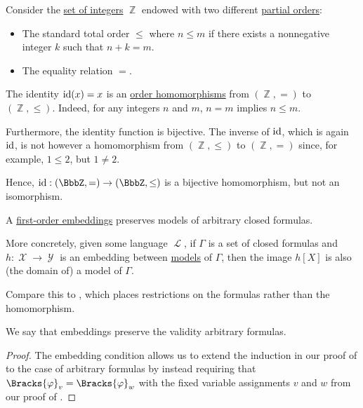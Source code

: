 \begin{example}\label{ex:bijective_order_homomorphism_not_isomorphism}
  Consider the \hyperref[def:integers]{set of integers} \( \BbbZ \) endowed with two different \hyperref[def:partially_ordered_set]{partial orders}:
  \begin{itemize}
    \item The standard total order \( \leq \) where \( n \leq m \) if there exists a nonnegative integer \( k \) such that \( n + k = m \).
    \item The equality relation \( = \).
  \end{itemize}

  The identity \( \operatorname{id}(x) = x \) is an \hyperref[def:order_function]{order homomorphisms} from \( (\BbbZ, =) \) to \( (\BbbZ, \leq) \). Indeed, for any integers \( n \) and \( m \), \( n = m \) implies \( n \leq m \).

  Furthermore, the identity function is bijective. The inverse of \( \operatorname{id} \), which is again \( \operatorname{id} \), is not however a homomorphism from \( (\BbbZ, \leq) \) to \( (\BbbZ, =) \) since, for example, \( 1 \leq 2 \), but \( 1 \neq 2 \).

  Hence, \( \id: (\BbbZ, =) \to (\BbbZ, \leq) \) is a bijective homomorphism, but not an isomorphism.
\end{example}

\begin{proposition}\label{thm:arbitrary_formulas_preserved_under_isomorphisms}
  A \hyperref[def:first_order_embedding]{first-order embeddings} preserves models of arbitrary closed formulas.

  More concretely, given some language \( \mscrL \), if \( \Gamma \) is a set of closed formulas and \( h: \mscrX \to \mscrY \) is an embedding between \hyperref[def:first_order_model]{models} of \( \Gamma \), then the image \( h[X] \) is also (the domain of) a model of \( \Gamma \).
\end{proposition}
\begin{comments}
  \item Compare this to , which places restrictions on the formulas rather than the homomorphism.
  \item We say that embeddings preserve the validity arbitrary formulas.
\end{comments}
\begin{proof}
  The embedding condition allows us to extend the induction in our proof of  to the case of arbitrary formulas by instead requiring that \( \Bracks{\varphi}_v = \Bracks{\varphi}_w \) with the fixed variable assignments \( v \) and \( w \) from our proof of .
\end{proof}

